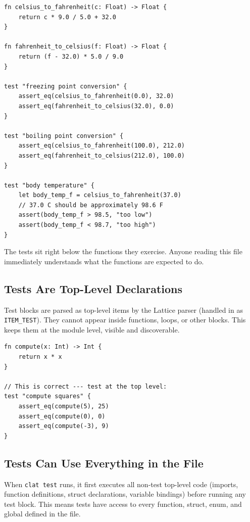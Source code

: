 \begin{lstlisting}[language=Lattice, caption={Temperature conversion with inline tests}]
fn celsius_to_fahrenheit(c: Float) -> Float {
    return c * 9.0 / 5.0 + 32.0
}

fn fahrenheit_to_celsius(f: Float) -> Float {
    return (f - 32.0) * 5.0 / 9.0
}

test "freezing point conversion" {
    assert_eq(celsius_to_fahrenheit(0.0), 32.0)
    assert_eq(fahrenheit_to_celsius(32.0), 0.0)
}

test "boiling point conversion" {
    assert_eq(celsius_to_fahrenheit(100.0), 212.0)
    assert_eq(fahrenheit_to_celsius(212.0), 100.0)
}

test "body temperature" {
    let body_temp_f = celsius_to_fahrenheit(37.0)
    // 37.0 C should be approximately 98.6 F
    assert(body_temp_f > 98.5, "too low")
    assert(body_temp_f < 98.7, "too high")
}
\end{lstlisting}

The tests sit right below the functions they exercise.
Anyone reading this file immediately understands what the functions are expected to do.

\subsection{Tests Are Top-Level Declarations}\label{sec:tests-top-level}

Test blocks are parsed as top-level items by the Lattice parser (handled in  as \lstinline|ITEM_TEST|).
They cannot appear inside functions, loops, or other blocks.
This keeps them at the module level, visible and discoverable.

\begin{lstlisting}[language=Lattice, caption={Tests belong at the top level}]
fn compute(x: Int) -> Int {
    return x * x
}

// This is correct --- test at the top level:
test "compute squares" {
    assert_eq(compute(5), 25)
    assert_eq(compute(0), 0)
    assert_eq(compute(-3), 9)
}
\end{lstlisting}

\subsection{Tests Can Use Everything in the File}\label{sec:tests-scope}

When \lstinline|clat test| runs, it first executes all non-test top-level code (imports, function definitions, struct declarations, variable bindings) before running any test block.
This means tests have access to every function, struct, enum, and global defined in the file.

